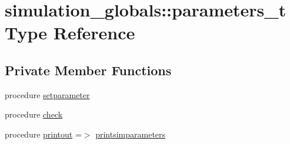 \hypertarget{structsimulation__globals_1_1parameters__t}{}\section{simulation\+\_\+globals\+:\+:parameters\+\_\+t Type Reference}
\label{structsimulation__globals_1_1parameters__t}
\subsection*{Private Member Functions}
\begin{DoxyCompactItemize}
\item 
procedure \mbox{\hyperlink{structsimulation__globals_1_1parameters__t_ad59ffcdf9208a52e7d3dae903197be74}{setparameter}}
\item 
procedure \mbox{\hyperlink{structsimulation__globals_1_1parameters__t_a5402a171a26d5e6a73b5bf284bf0aa57}{check}}
\item 
procedure \mbox{\hyperlink{structsimulation__globals_1_1parameters__t_a6b56d89976f9cef3fef2e8f54fcb1bdf}{printout}} =$>$ \mbox{\hyperlink{namespacesimulation__globals_a0b17b2f2e9e7dbbad7c9d735217c1ee1}{printsimparameters}}
\end{DoxyCompactItemize}
